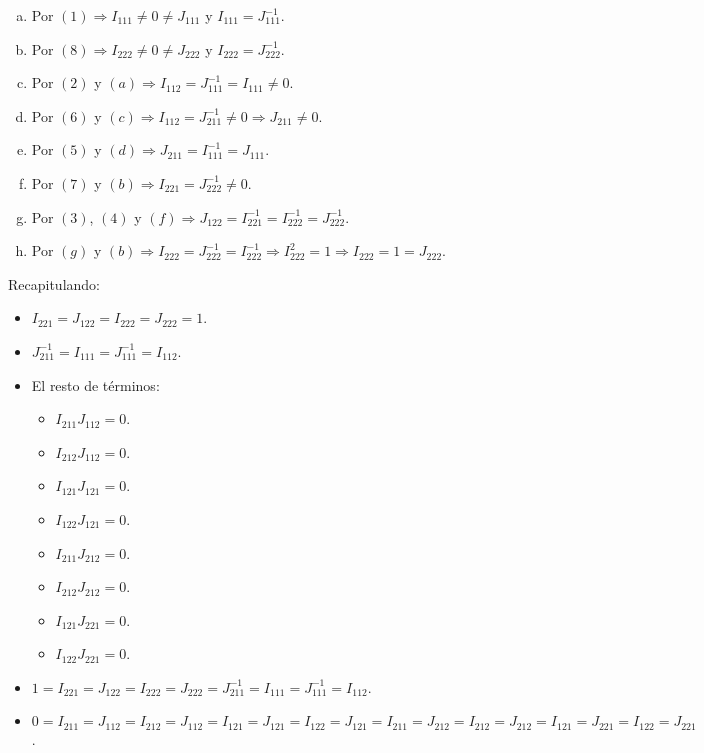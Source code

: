 \begin{enumerate}[(a)]
	\item Por $(1) \Rightarrow I_{111} \neq 0 \neq J_{111}$ y $I_{111} = J_{111}^{-1}$.
	\item Por $(8) \Rightarrow I_{222} \neq 0 \neq J_{222}$ y $I_{222} = J_{222}^{-1}$.
	\item Por $(2)$ y $(a) \Rightarrow I_{112} = J_{111}^{-1} = I_{111} \neq 0$.
	\item Por $(6)$ y $(c) \Rightarrow I_{112} = J_{211}^{-1} \neq 0 \Rightarrow J_{211} \neq 0$.
	\item Por $(5)$ y $(d) \Rightarrow J_{211} = I_{111}^{-1} = J_{111}$.
	\item Por $(7)$ y $(b) \Rightarrow I_{221} = J_{222}^{-1} \neq 0$.
	\item Por $(3)$, $(4)$ y $(f) \Rightarrow J_{122} = I_{221}^{-1} = I_{222}^{-1} = J_{222}^{-1}$.
	\item Por $(g)$ y $(b) \Rightarrow I_{222} = J_{222}^{-1} = I_{222}^{-1} \Rightarrow I_{222}^2 = 1 \Rightarrow I_{222} = 1 = J_{222}$.
\end{enumerate}

\newpage

Recapitulando:

\begin{itemize}
	\item $I_{221} = J_{122} = I_{222} = J_{222} = 1$.
	\item $J_{211}^{-1} = I_{111} = J_{111}^{-1} = I_{112}$.
	\item El resto de términos:

	\begin{itemize}
		\item $I_{211} J_{112} = 0$.
		\item $I_{212} J_{112} = 0$.
		\item $I_{121} J_{121} = 0$.
		\item $I_{122} J_{121} = 0$.
		\item $I_{211} J_{212} = 0$.
		\item $I_{212} J_{212} = 0$.
		\item $I_{121} J_{221} = 0$.
		\item $I_{122} J_{221} = 0$.
	\end{itemize}
\end{itemize}

\begin{itemize}
	\item $1 = I_{221} = J_{122} = I_{222} = J_{222} = J_{211}^{-1} = I_{111} = J_{111}^{-1} = I_{112}$.
	\item $0 = I_{211} = J_{112} = I_{212} = J_{112} = I_{121} = J_{121} = I_{122} = J_{121} = I_{211} = J_{212} = I_{212} = J_{212} = I_{121} = J_{221} = I_{122} = J_{221}$.
\end{itemize}

